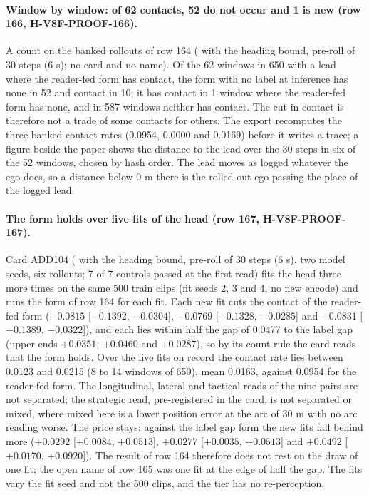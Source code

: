 \paragraph{Window by window: of 62 contacts, 52 do not occur and 1 is new (row 166, H-V8F-PROOF-166).} A count on the banked rollouts of row 164 ( with the heading bound, pre-roll of 30 steps (6 s); no card and no name). Of the 62 windows in 650 with a lead where the reader-fed form has contact, the form with no label at inference has none in 52 and contact in 10; it has contact in 1 window where the reader-fed form has none, and in 587 windows neither has contact. The cut in contact is therefore not a trade of some contacts for others. The export recomputes the three banked contact rates (0.0954, 0.0000 and 0.0169) before it writes a trace; a figure beside the paper shows the distance to the lead over the 30 steps in six of the 52 windows, chosen by hash order. The lead moves as logged whatever the ego does, so a distance below 0 m there is the rolled-out ego passing the place of the logged lead.

\paragraph{The form holds over five fits of the head (row 167, H-V8F-PROOF-167).} Card ADD104 ( with the heading bound, pre-roll of 30 steps (6 s), two model seeds, six rollouts; 7 of 7 controls passed at the first read) fits the head three more times on the same 500 train clips (fit seeds 2, 3 and 4, no new encode) and runs the form of row 164 for each fit. Each new fit cuts the contact of the reader-fed form ($-0.0815$ [$-0.1392$, $-0.0304$], $-0.0769$ [$-0.1328$, $-0.0285$] and $-0.0831$ [$-0.1389$, $-0.0322$]), and each lies within half the gap of 0.0477 to the label gap (upper ends $+0.0351$, $+0.0460$ and $+0.0287$), so by its count rule the card reads that the form holds. Over the five fits on record the contact rate lies between 0.0123 and 0.0215 (8 to 14 windows of 650), mean 0.0163, against 0.0954 for the reader-fed form. The longitudinal, lateral and tactical reads of the nine pairs are not separated; the strategic read, pre-registered in the card, is not separated or mixed, where mixed here is a lower position error at the arc of 30 m with no arc reading worse. The price stays: against the label gap form the new fits fall behind more ($+0.0292$ [$+0.0084$, $+0.0513$], $+0.0277$ [$+0.0035$, $+0.0513$] and $+0.0492$ [$+0.0170$, $+0.0920$]). The result of row 164 therefore does not rest on the draw of one fit; the open name of row 165 was one fit at the edge of half the gap. The fits vary the fit seed and not the 500 clips, and the tier has no re-perception.

